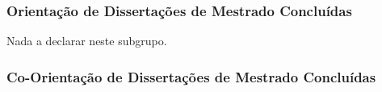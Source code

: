 \documentclass[a4paper,oneside,10pt]{article}
\begin{document}

\subsubsection{Orienta\c{c}\~{a}o de Disserta\c{c}\~{o}es de Mestrado Conclu\'{i}das}
\vspace{0.3cm}

Nada a declarar neste subgrupo.
%
%
%


\subsubsection{Co-Orienta\c{c}\~{a}o de Disserta\c{c}\~{o}es de Mestrado Conclu\'{i}das}
\vspace{0.3cm}

\end{document}
